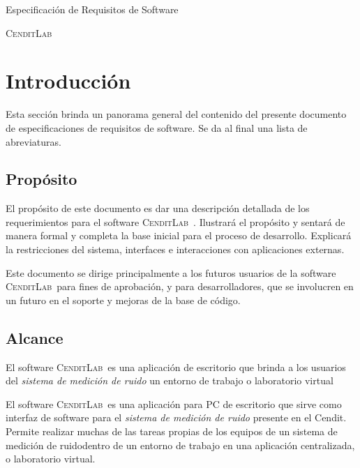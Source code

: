 \documentclass[paper=a4,oneside,fontsize=12pt]{scrartcl}
\newcommand{\AppName}{\textsc{CenditLab}\ }
\newcommand{\smr}{sistema de medición de ruido}
\newcommand{\cendit}{Cendit}
\begin{document}
	
	\begin{titlepage}
				
		\begin{center}	
			
			\vspace{10cm}
			
			\begin{Large}			
				Especificación de Requisitos de Software
			\end{Large}
		
			\begin{Huge}
				\textsc{\AppName}
			\end{Huge}
			
		\end{center}
		
	\end{titlepage}

	\tableofcontents
	
	\section{Introducción}
	Esta sección brinda un panorama general del contenido del presente documento de especificaciones de requisitos de software. Se da al final una lista de abreviaturas.
	
	\subsection{Propósito}
	El propósito de este documento es dar una descripción detallada de los requerimientos para el software \AppName. Ilustrará el propósito y sentará de manera formal y completa la base inicial para el proceso de desarrollo. Explicará la restricciones del sistema, interfaces e interacciones con aplicaciones externas. 
	
	Este documento se dirige principalmente a los futuros usuarios de la software \AppName para fines de aprobación, y para desarrolladores, que se involucren en un futuro en el soporte y mejoras de la base de código.
	
	\subsection{Alcance}
	
	El software \AppName es una aplicación de escritorio que brinda a los usuarios del \emph{\smr} un entorno de trabajo o laboratorio virtual 
	
	El software \AppName es una aplicación para PC de escritorio que sirve como interfaz de software para el \emph{\smr} presente en el \cendit. Permite realizar muchas de las tareas propias de los equipos de un \smr dentro de un entorno de trabajo en una aplicación centralizada, o laboratorio virtual. 
	
\end{document}
